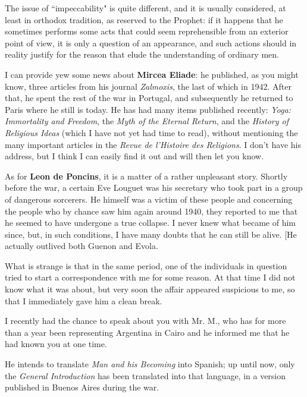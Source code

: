 The issue of ``impeccability" is quite different, and it is usually considered, at least in orthodox tradition, as reserved to the Prophet: if it happens that he sometimes performs some acts that could seem reprehensible from an exterior point of view, it is only a question of an appearance, and such actions should in reality justify for the reason that elude the understanding of ordinary men.

I can provide yew some news about \textbf{Mircea Eliade}: he published, as you might know, three articles from his journal \emph{Zalmoxis}, the last of which in 1942. After that, he spent the rest of the war in Portugal, and subsequently he returned to Paris where he still is today. He has had many items published recently: \emph{Yoga: Immortality and Freedom}, the \emph{Myth of the Eternal Return}, and the \emph{History of Religious Ideas} (which I have not yet had time to read), without mentioning the many important articles in the \emph{Revue de l'Histoire des Religions}. I don't have his address, but I think I can easily find it out and will then let you know.

As for \textbf{Leon de Poncins}, it is a matter of a rather unpleasant story. Shortly before the war, a certain Eve Louguet was his secretary who took part in a group of dangerous sorcerers. He himself was a victim of these people and concerning the people who by chance saw him again around 1940, they reported to me that he seemed to have undergone a true collapse. I never knew what became of him since, but, in such conditions, I have many doubts that he can still be alive. [He actually outlived both Guenon and Evola. \flright{\textsc{ed.]}}

What is strange is that in the same period, one of the individuals in question tried to start a correspondence with me for some reason. At that time I did not know what it was about, but very soon the affair appeared suspicious to me, so that I immediately gave him a clean break.

I recently had the chance to speak about you with Mr. M., who has for more than a year been representing Argentina in Cairo and he informed me that he had known you at one time.

He intends to translate \emph{Man and his Becoming} into Spanish; up until now, only the \emph{General Introduction} has been translated into that language, in a version published in Buenos Aires during the war.

